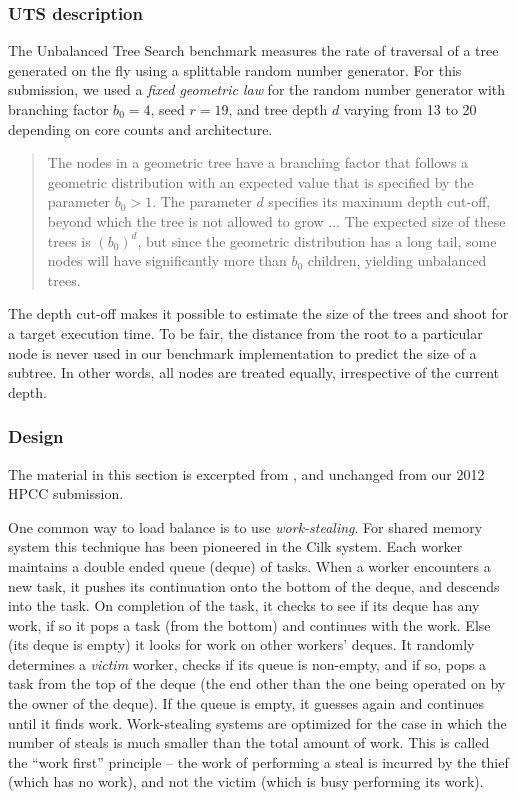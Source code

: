 
\subsubsection{UTS description}
The Unbalanced Tree Search benchmark measures the rate of traversal of
a tree generated on the fly using a splittable random number
generator. For this submission, we used a \emph{fixed geometric law}
for the random number generator with branching factor $b_0=4$, seed
$r=19$, and tree depth $d$ varying from 13 to 20 depending on core counts and architecture.

\begin{quote}
The nodes in a geometric tree have a branching factor that follows a
geometric distribution with an expected value that is specified by the  
parameter $b_0 > 1$. The parameter $d$ specifies its maximum depth
cut-off, beyond which the tree is not allowed to grow ... The expected
size of these trees is $(b_0)^d$, but since the geometric distribution
has a long tail, some nodes will have significantly more than $b_0$
children, yielding unbalanced trees. 
\end{quote}

The depth cut-off makes it possible to estimate the size of the trees
and shoot for a target execution time. To be fair, the distance from
the root to a particular node is never used in our benchmark
implementation to predict the size of a subtree. In other words, all
nodes are treated equally, irrespective of the current depth.  

\subsubsection{Design}

The material in this section is excerpted from \cite{glb}, and
unchanged from our 2012 HPCC submission.

One common way to load balance is to use {\em work-stealing}. For
shared memory system this technique has been pioneered in the Cilk
system.  Each worker maintains a double ended queue (deque) of tasks. When a
worker encounters a new task, it pushes its continuation onto the
bottom of the deque, and descends into the task. On completion of the task, it
checks to see if its deque has any work, if so it pops a task (from the
bottom) and continues with the work. Else (its deque is empty) it
looks for work on other workers' deques. It randomly determines a {\em
  victim} worker, checks if its queue is non-empty, and if so, pops a
task from the top of the deque (the end other than the one being
operated on by the owner of the deque).  If the queue is empty, it
guesses again and continues until it finds work. Work-stealing systems
are optimized for the case in which the number of steals is much
smaller than the total amount of work. This is called the ``work
first'' principle -- the work of performing a steal is incurred by the
thief (which has no work), and not the victim (which is busy
performing its work). 

